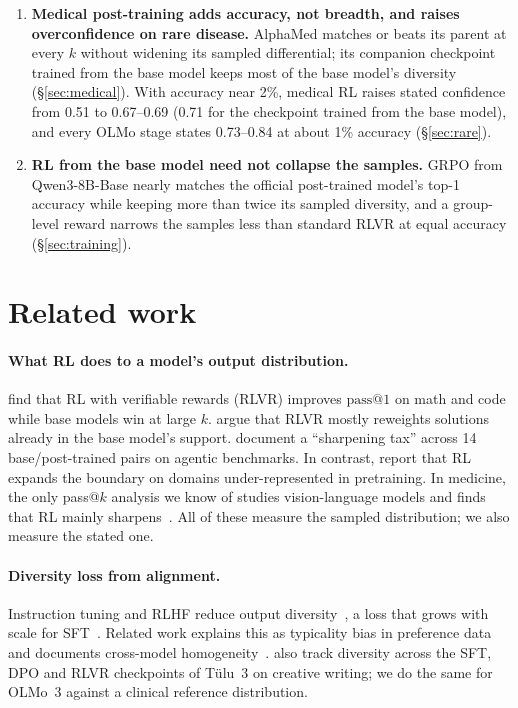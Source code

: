 \documentclass[11pt]{article}
\makeatletter
\newcommand{\passk}[1]{\mathrm{pass@}#1}
\makeatother
\begin{document}
\begin{enumerate}
\item \textbf{Medical post-training adds accuracy, not breadth, and raises overconfidence on rare disease.} AlphaMed matches or beats its parent at every $k$ without widening its sampled differential; its companion checkpoint trained from the base model keeps most of the base model's diversity (\S\ref{sec:medical}). With accuracy near 2\%, medical RL raises stated confidence from 0.51 to 0.67--0.69 (0.71 for the checkpoint trained from the base model), and every OLMo stage states 0.73--0.84 at about 1\% accuracy (\S\ref{sec:rare}).
\item \textbf{RL from the base model need not collapse the samples.} GRPO from Qwen3-8B-Base nearly matches the official post-trained model's top-1 accuracy while keeping more than twice its sampled diversity, and a group-level reward narrows the samples less than standard RLVR at equal accuracy (\S\ref{sec:training}).
\end{enumerate}

\section{Related work}
\paragraph{What RL does to a model's output distribution.}
\citet{yue2025rlboundary} find that RL with verifiable rewards (RLVR) improves $\passk{1}$ on math and code while base models win at large $k$.
\citet{wu2025invisibleleash} argue that RLVR mostly reweights solutions already in the base model's support.
\citet{oh2026sharpeningtax} document a ``sharpening tax'' across 14 base/post-trained pairs on agentic benchmarks.
In contrast, \citet{cheng2025guru} report that RL expands the boundary on domains under-represented in pretraining.
In medicine, the only pass@$k$ analysis we know of studies vision-language models and finds that RL mainly sharpens~\citep{jeddi2026medvlmrl}.
All of these measure the sampled distribution; we also measure the stated one.

\paragraph{Diversity loss from alignment.}
Instruction tuning and RLHF reduce output diversity~\citep{kirk2024rlhfdiversity,west2025basemodels,murthy2025onefish}, a loss that grows with scale for SFT~\citep{springer2026annotations}. Related work explains this as typicality bias in preference data~\citep{zhang2025verbalized} and documents cross-model homogeneity~\citep{jiang2025hivemind}.
\citet{zhang2025verbalized} also track diversity across the SFT, DPO and RLVR checkpoints of Tülu~3 on creative writing; we do the same for OLMo~3 against a clinical reference distribution.
\end{document}
